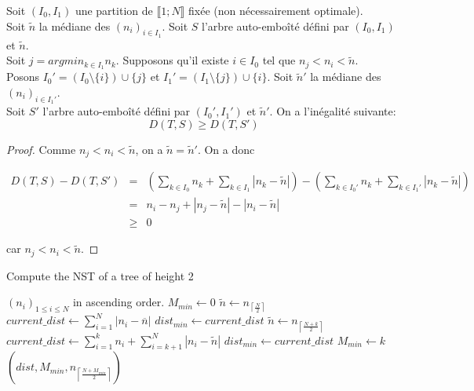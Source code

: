 \begin{lem}
  \label{lem4}
  Soit $(I_{0}, I_{1})$ une partition de $\llbracket 1;N \rrbracket$
  fixée (non nécessairement optimale).\\
  Soit $\tilde{n}$ la médiane des $(n_{i})_{i \in I_{1}}$.
  Soit $S$ l'arbre auto-emboîté défini par $(I_{0}, I_{1})$ et $\tilde{n}$.\\
  Soit $j = argmin_{k \in I_{1}}n_{k}$.  Supposons qu'il existe
  $i \in I_{0}$ tel que $n_{j} < n_{i} < \tilde{n}$.\\
  Posons $I_{0}' = (I_{0} \setminus \{i\}) \cup \{j\}$ et
  $I_{1}' = (I_{1} \setminus \{j\}) \cup \{i\}$. Soit
  $\tilde{n}'$ la médiane des $(n_{i})_{i \in I_{1}'}$.\\
  Soit $S'$ l'arbre auto-emboîté défini par $(I_{0}', I_{1}')$ et
  $\tilde{n}'$. On a l'inégalité suivante:
  $$D(T,S) \geqslant D(T,S')$$
  \begin{proof}
    Comme $n_{j} < n_{i} < \tilde{n}$, on a $\tilde{n} = \tilde{n}'$.
    On a donc 
    \begin{center}
      $
      \begin{array}{rcl}
        D(T,S) - D(T,S') &=& \left( \sum_{k \in I_{0}} n_{k} + \sum_{k \in
                            I_{1}} |n_{k} - \tilde{n}| \right) -\left( \sum_{k \in
                            I_{0}'} n_{k} + \sum_{k \in
                            I_{1}'} |n_{k} - \tilde{n}| \right)\\
                        &=& n_{i} - n_{j} + |n_{j} - \tilde{n}| -|n_{i} - \tilde{n}|\\
                        & \geqslant & 0
      \end{array}
      $
    \end{center}
    car $n_{j} < n_{i} < \tilde{n}$.
  \end{proof}
\end{lem}

\begin{algorithm}
\label{algo1}
\caption{Compute the NST of a tree of height 2}
\begin{algorithmic} 
\REQUIRE $(n_{i})_{1 \leqslant i \leqslant N}$ in ascending order.
\STATE $M_{min} \leftarrow 0$
\STATE $\tilde{n} \leftarrow n_{\left\lceil \frac{N}{2} \right\rceil}$ 
\STATE $current\_dist \leftarrow \sum_{i=1}^{N} |n_{i} - \overline{n}|$
\STATE $dist_{min} \leftarrow current\_dist$
\STATE $\tilde{n} \leftarrow n_{\left\lceil \frac{N+k}{2} \right\rceil}$ 
\STATE $current\_dist \leftarrow \sum_{i = 1}^{k} n_{i} + \sum_{i=
  k+1}^{N} |n_{i} - \tilde{n}|$
\STATE $dist_{min} \leftarrow current\_dist$
\STATE $M_{min} \leftarrow k$
\ENDIF
\ENDFOR
\RETURN $(dist, M_{min}, n_{\left\lceil \frac{N + M_{min}}{2} \right\rceil})$ 
\end{algorithmic}
\end{algorithm}

